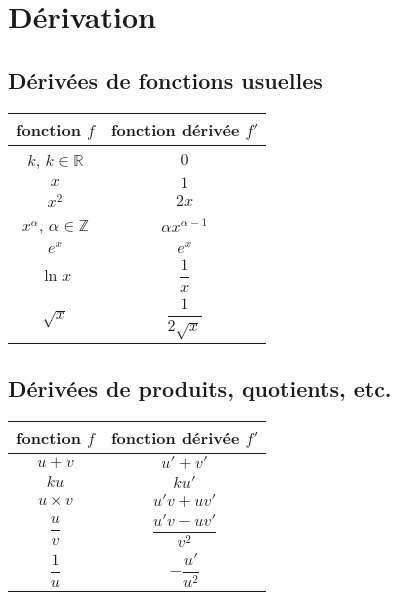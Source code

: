 \section*{Dérivation}

\subsection*{Dérivées de fonctions usuelles}

\begin{center}

\begin{tabular}{|c|c|}
\hline 
\textbf{fonction $f$} & \textbf{fonction dérivée $f'$} \\ 
\hline 
$k$, $k \in \mathbb{R}$ & $0$ \\ 
\hline 
$x$ & $1$ \\ 
\hline 
$x^2$ & $2x$ \\ 
\hline 
$x^{\alpha}$, $\alpha \in \mathbb{Z}$ & $\alpha x^{\alpha - 1}$ \\ 
\hline 
$e^x$ & $e^x$ \\ 
\hline 
$\ln x$ & $\dfrac{1}{x}$ \\ 
\hline 
$\sqrt{x}$ & $\dfrac{1}{2\sqrt{x}}$ \\ 
\hline 
\end{tabular} 
\end{center}

\subsection*{Dérivées de produits, quotients, etc.}

\begin{center}
\begin{tabular}{|c|c|}
\hline 
\textbf{fonction $f$} & \textbf{fonction dérivée $f'$} \\ 
\hline 
$u+v$ & $u'+v'$ \\ 
\hline 
$ku$ & $ku'$ \\ 
\hline 
$u \times v$ & $u'v+uv'$ \\ 
\hline 
$\dfrac{u}{v}$ & $\dfrac{u'v-uv'}{v^2}$ \\ 
\hline 
$\dfrac{1}{u}$ & $-\dfrac{u'}{u^2}$ \\ 
\hline 
\end{tabular} 
\end{center}

